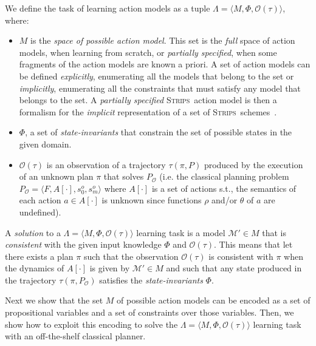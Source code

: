 \documentclass{article}
\newcommand{\tup}[1]{{\langle #1 \rangle}}
\newcommand{\strips}{\textsc{Strips}}
\begin{document}
We define the task of learning action models as a tuple $\Lambda=\tup{M,\Phi,\mathcal{O}(\tau)}$, where:
\begin{itemize}
\item $M$ is the {\em space of possible action model}. This set is the {\em full} space of action models, when learning from scratch, or {\em partially specified}, when some fragments of the action models are known a priori. A set of action models can be defined {\em explicitly}, enumerating all the models that belong to the set or {\em implicitly}, enumerating all the constraints that must satisfy any model that belongs to the set. A {\em partially specified} \strips\ action model is then a formalism for the {\em implicit} representation of a set of \strips\ schemes~\cite{sreedharan2018handling}. 
\item $\Phi$, a set of {\em state-invariants} that constrain the set of possible states in the given domain.
\item $\mathcal{O}(\tau)$ is an observation of a trajectory $\tau(\pi,P)$ produced by the execution of an unknown plan $\pi$ that solves $P_\mathcal{O}$ (i.e. the classical planning problem $P_\mathcal{O}=\tup{F,A[\cdot],s_0^o,s_m^o}$ where $A[\cdot]$ is a set of actions s.t., the semantics of each action $a\in A[\cdot]$ is unknown since functions $\rho$ and/or $\theta$ of $a$ are undefined). 
\end{itemize}

A {\em solution} to a $\Lambda=\tup{M,\Phi,\mathcal{O}(\tau)}$ learning task is a model $\mathcal{M}'\in M$ that is {\em consistent} with the given input knowledge $\Phi$ and $\mathcal{O}(\tau)$. This means that let there exists a plan $\pi$ such that the observation $\mathcal{O}(\tau)$ is consistent with $\pi$ when the dynamics of $A[\cdot]$ is given by $\mathcal{M}'\in M$ and such that any state produced in the trajectory $\tau(\pi,P_\mathcal{O})$ satisfies the {\em state-invariants} $\Phi$.


Next we show that the set $M$ of possible action models can be encoded as a set of propositional variables and a set of constraints over those variables. Then, we show how to exploit this encoding to solve the $\Lambda=\tup{M,\Phi,\mathcal{O}(\tau)}$ learning task with an off-the-shelf classical planner.
\end{document}
